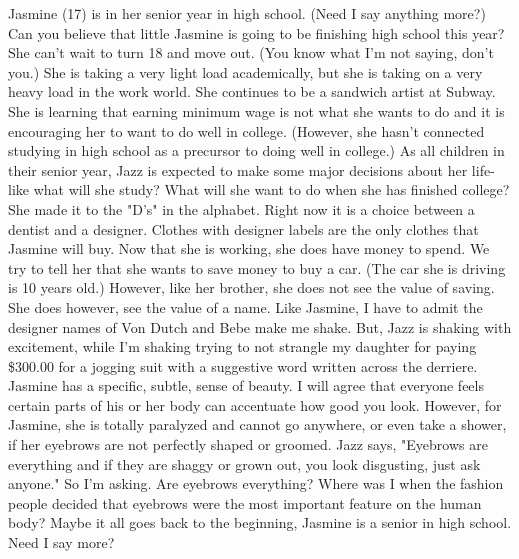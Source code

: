 Jasmine (17) is in her senior year in high school.  (Need I say anything more?)  Can you believe that little Jasmine is going to be finishing
high school this year? She can't wait to turn 18 and move out. (You know what I'm not saying, don't you.) She is taking a very light load
academically, but she is taking on a very heavy load in the work world.  She continues to be a sandwich artist at Subway.  She is learning that
earning minimum wage is not what she wants to do and it is encouraging her to want to do well in college. (However, she hasn't connected
studying in high school as a precursor to doing well in college.)  As all children in their senior year, Jazz is expected to make some major
decisions about her life-like what will she study?  What will she want to do when she has finished college?  She made it to the "D's" in the
alphabet.  Right now it is a choice between a dentist and a designer.  Clothes with designer labels are the only clothes that Jasmine will buy.
Now that she is working, she does have money to spend.  We try to tell her that she wants to save money to buy a car.  (The car she is driving
is 10 years old.) However, like her brother, she does not see the value of saving.  She does however, see the value of a name.  Like Jasmine, I
have to admit the designer  names of Von Dutch and Bebe make me shake.  But, Jazz is shaking with excitement, while I'm shaking trying to not
strangle my daughter for paying \$300.00 for a jogging suit with a suggestive word written across the derriere.  Jasmine has a specific, subtle,
sense of beauty.  I will agree that everyone feels certain parts of his or her body can accentuate how good you look.  However, for Jasmine, she
is totally paralyzed and cannot go anywhere, or even take a shower, if her eyebrows are not perfectly shaped or groomed.  Jazz says, "Eyebrows
are everything and if they are shaggy or grown out, you look disgusting, just ask anyone."  So I'm asking.  Are eyebrows everything?  Where was
I when the fashion people decided that eyebrows were the most important feature on the human body?  Maybe it all goes back to the beginning,
Jasmine is a senior in high school.  Need I say more?

